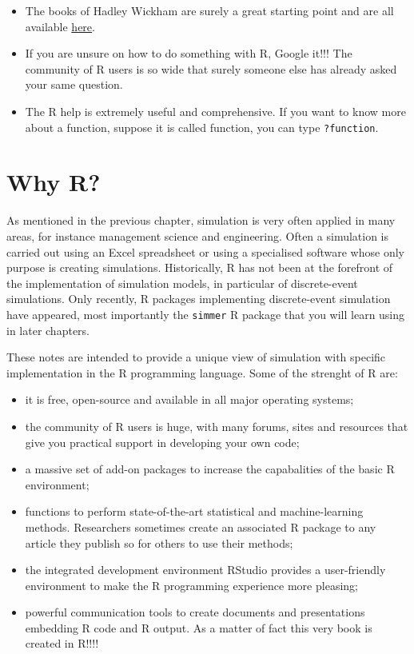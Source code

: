 \documentclass[
]{book}
\begin{document}
\begin{itemize}
\item
  The books of Hadley Wickham are surely a great starting point and are all available \href{http://hadley.nz/}{here}.
\item
  If you are unsure on how to do something with R, Google it!!! The community of R users is so wide that surely someone else has already asked your same question.
\item
  The R help is extremely useful and comprehensive. If you want to know more about a function, suppose it is called function, you can type \texttt{?function}.
\end{itemize}

\hypertarget{why-r}{%
\section{Why R?}\label{why-r}}

As mentioned in the previous chapter, simulation is very often applied in many areas, for instance management science and engineering. Often a simulation is carried out using an Excel spreadsheet or using a specialised software whose only purpose is creating simulations. Historically, R has not been at the forefront of the implementation of simulation models, in particular of discrete-event simulations. Only recently, R packages implementing discrete-event simulation have appeared, most importantly the \texttt{simmer} R package that you will learn using in later chapters.

These notes are intended to provide a unique view of simulation with specific implementation in the R programming language. Some of the strenght of R are:

\begin{itemize}
\item
  it is free, open-source and available in all major operating systems;
\item
  the community of R users is huge, with many forums, sites and resources that give you practical support in developing your own code;
\item
  a massive set of add-on packages to increase the capabalities of the basic R environment;
\item
  functions to perform state-of-the-art statistical and machine-learning methods. Researchers sometimes create an associated R package to any article they publish so for others to use their methods;
\item
  the integrated development environment RStudio provides a user-friendly environment to make the R programming experience more pleasing;
\item
  powerful communication tools to create documents and presentations embedding R code and R output. As a matter of fact this very book is created in R!!!!
\end{itemize}
\end{document}
